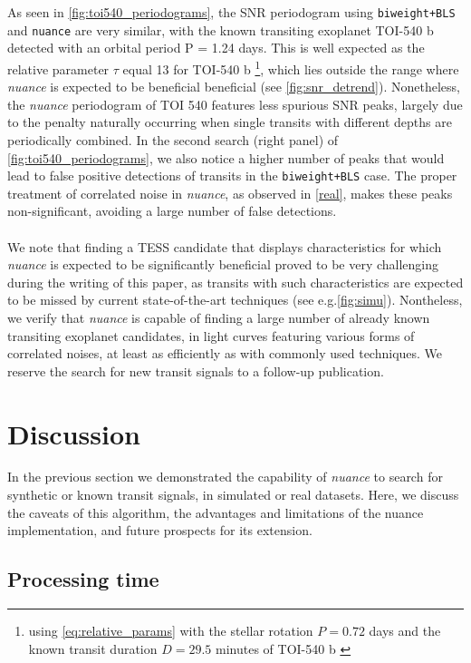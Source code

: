 \documentclass[modern]{aastex631}
\newcommand{\nuancemethod}{\textit{nuance}}
\newcommand{\nuance}{\nuancemethod{}}
\newcommand{\nuancecode}{\textsf{nuance}}
\begin{document}
As seen in \autoref{fig:toi540_periodograms}, the SNR periodogram using \texttt{biweight+BLS} and \texttt{nuance} are very similar, with the known transiting exoplanet TOI-540 b detected with an orbital period P = 1.24 days. This is well expected as the relative parameter $\tau$ equal 13 for TOI-540 b \footnote{using \autoref{eq:relative_params} with the stellar rotation $P=0.72$ days and the known transit duration $D=29.5$ minutes of TOI-540 b \citep{TOI540}}, which lies outside the range where \nuancemethod{} is expected to be beneficial beneficial (see \autoref{fig:snr_detrend}). Nonetheless, the \nuance{} periodogram of TOI 540 features less spurious SNR peaks, largely due to the penalty naturally occurring when single transits with different depths are periodically combined. In the second search (right panel) of \autoref{fig:toi540_periodograms}, we also notice a higher number of peaks that would lead to false positive detections of transits in the \texttt{biweight+BLS} case. The proper treatment of correlated noise in \nuance{}, as observed in \autoref{real}, makes these peaks non-significant, avoiding a large number of false detections.\\\\
We note that finding a TESS candidate that displays characteristics for which \nuance{} is expected to be significantly beneficial proved to be very challenging during the writing of this paper, as transits with such characteristics are expected to be missed by current state-of-the-art techniques (see e.g.\;\autoref{fig:simu}). Nontheless, we verify that \nuancemethod{} is capable of finding a large number of already known transiting exoplanet candidates, in light curves featuring various forms of correlated noises, at least as efficiently as with commonly used techniques. We reserve the search for new transit signals to a follow-up publication.

\newpage
\section{Discussion}\label{discussion}

In the previous section we demonstrated the capability of \nuance{} to search for synthetic or known transit signals, in simulated or real datasets. Here, we discuss the caveats of this algorithm, the advantages and limitations of the \nuancecode{} implementation, and future prospects for its extension.

\subsection{Processing time}
\end{document}
